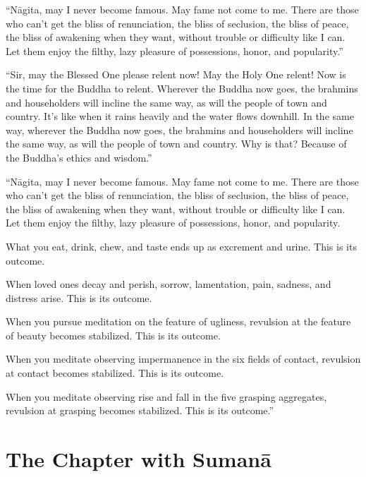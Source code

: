\documentclass[12pt,openany]{book}%
\let\oldcontentsline\contentsline
\newcommand{\nopagecontentsline}[3]{\oldcontentsline{#1}{#2}{}}
\newcommand*{\tocchapterline}[1]{\bfseries\itshape{#1}}
\begin{document}
“\textsanskrit{Nāgita}, may I never become famous. May fame not come to me. There are those who can’t get the bliss of renunciation, the bliss of seclusion, the bliss of peace, the bliss of awakening when they want, without trouble or difficulty like I can. Let them enjoy the filthy, lazy pleasure of possessions, honor, and popularity.” 

“Sir, may the Blessed One please relent now! May the Holy One relent! Now is the time for the Buddha to relent. Wherever the Buddha now goes, the brahmins and householders will incline the same way, as will the people of town and country. It’s like when it rains heavily and the water flows downhill. In the same way, wherever the Buddha now goes, the brahmins and householders will incline the same way, as will the people of town and country. Why is that? Because of the Buddha’s ethics and wisdom.” 

“\textsanskrit{Nāgita}, may I never become famous. May fame not come to me. There are those who can’t get the bliss of renunciation, the bliss of seclusion, the bliss of peace, the bliss of awakening when they want, without trouble or difficulty like I can. Let them enjoy the filthy, lazy pleasure of possessions, honor, and popularity. 

What you eat, drink, chew, and taste ends up as excrement and urine. This is its outcome. 

When loved ones decay and perish, sorrow, lamentation, pain, sadness, and distress arise. This is its outcome. 

When you pursue meditation on the feature of ugliness, revulsion at the feature of beauty becomes stabilized. This is its outcome. 

When you meditate observing impermanence in the six fields of contact, revulsion at contact becomes stabilized. This is its outcome. 

When you meditate observing rise and fall in the five grasping aggregates, revulsion at grasping becomes stabilized. This is its outcome.” 

%
\chapter*{The Chapter with Sumanā }
\addcontentsline{toc}{chapter}{\tocchapterline{The Chapter with Sumanā }}
\addtocontents{toc}{\let\protect\contentsline\protect\oldcontentsline}
\end{document}
